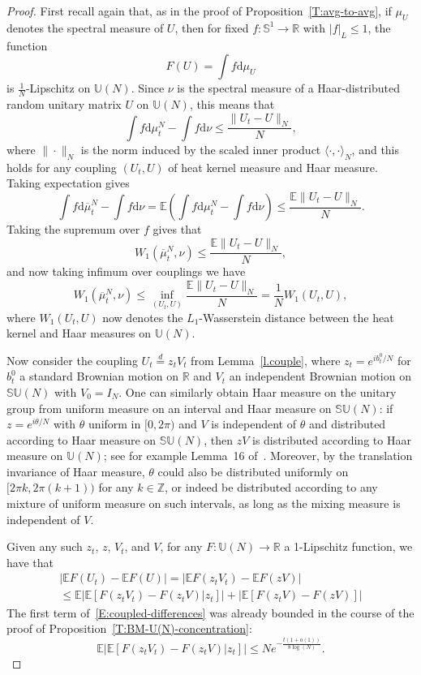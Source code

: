 \documentclass[11pt]{article}
\theoremstyle{definition}
\numberwithin{equation}{section}
\numberwithin{figure}{section}
\numberwithin{table}{section}
\newcommand{\Unitary}[1]{\mathbb{U}\left(#1\right)}
\newcommand{\SUnitary}[1]{\mathbb{SU}\left(#1\right)}
\newcommand{\Circle}{\mathbb{S}^1}
\newcommand{\R}{\mathbb{R}}
\newcommand{\E}{\mathbb{E}}
\newcommand{\Z}{\mathbb{Z}}
\newcommand*{\dd}{\mathrm{d}}
\newcommand*{\dmu}{\dd \mu}
\newcommand*{\dnu}{\dd \nu}
\newcommand*{\dbmu}{\dd \overline{\mu}}
\begin{document}
\begin{proof}
First recall again that, as in the proof of Proposition~\ref{T:avg-to-avg}, if $\mu_U$ denotes the spectral measure of $U$, then for fixed $f:\Circle\to\R$ with $|f|_L\le 1$, the function
\[
F(U)=\int f\dmu_U
\]
is $\frac{1}{N}$-Lipschitz on $\Unitary{N}$. Since $\nu$ is the spectral measure of a Haar-distributed random unitary matrix $U$ on $\Unitary{N}$, this means that
\[
\int f\dmu^N_t-\int f\dnu\le\frac{\|U_t-U\|_{N}}{N},
\]
where $\|\cdot\|_N$ is the norm induced by the scaled inner product $\langle\cdot,\cdot\rangle_N$, and this holds for any coupling $(U_t,U)$ of heat kernel measure and Haar measure. Taking expectation gives
\[
\int f\dbmu^N_t-\int f\dnu=\E\left(\int f\dmu^N_t-\int f\dnu\right)\le\frac{\E \|U_t-U\|_{N}}{N}.
\]
Taking the supremum over $f$ gives that
\[
W_1(\overline{\mu}^N_t,\nu)\le\frac{\E\|U_t-U\|_{N}}{N},
\]
and now taking infimum over couplings we have
\begin{equation}\label{eB}
W_1(\overline{\mu}^N_t,\nu)\le\inf_{(U_t,U)}\frac{\E\|U_t-U\|_{N}}{N}=\frac{1}{N}W_1(U_t,U),
\end{equation}
where $W_1(U_t,U)$ now denotes the $L_1$-Wasserstein distance between the heat kernel and Haar measures on $\mathbb{U}(N)$.

Now consider the coupling $U_t\overset{d}{=}z_tV_t$ from Lemma~\ref{l.couple}, where $z_t=e^{ib_t^0/N}$ for $b^0_t$ a standard Brownian motion on $\R$ and $V_t$ an independent Brownian motion on $\SUnitary{N}$ with $V_0=I_N$. One can similarly obtain Haar measure on the unitary group from uniform measure on an interval and Haar measure on $\SUnitary{N}$: if $z=e^{i\theta/N}$ with $\theta$ uniform in $[0,2\pi)$ and $V$ is independent of $\theta$ and distributed according to Haar measure on $\SUnitary{N}$, then $zV$ is distributed according to Haar measure on $\Unitary{N}$; see for example Lemma~16 of~\cite{MM-ECP-2013}. Moreover, by the translation invariance of Haar measure, $\theta$ could also be distributed uniformly on $[2\pi k,2\pi(k+1))$ for any $k\in\Z$, or indeed be distributed according to any mixture of uniform measure on such intervals, as long as the mixing measure is independent of $V$.

Given any such $z_t$, $z$, $V_t$, and $V$, for any $F:\Unitary{N}\to\R$ a 1-Lipschitz function, we have that
\begin{multline}\label{E:coupled-differences}
\big|\E F(U_t)-\E F(U)\big|=\big|\E F(z_tV_t)-\E F(zV)\big|\\
\le\E\left|\E\left[F(z_tV_t)-F(z_tV)\Big|z_t\right]\right|+\left|\E\left[F(z_tV)-F(zV)\right]\right|
\end{multline}
The first term of~\eqref{E:coupled-differences} was already bounded in the course of the proof of Proposition~\ref{T:BM-U(N)-concentration}:
\begin{equation}\label{e.done}
\E\left|\E\left[F(z_tV_t)-F(z_tV)\Big|z_t\right]\right|\le Ne^{-\frac{t(1+o(1))}{8\log(N)}}.
\end{equation}


\end{proof}
\end{document}
